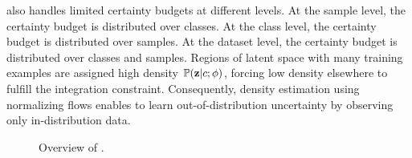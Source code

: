 \PostNet also handles limited certainty budgets at different levels. At the sample level, the certainty budget \smash{$\alpha_0\dataix = \sum_\iclass \alpha_\iclass\dataix$} is distributed over classes. At the class level, the certainty budget  is distributed over samples. At the dataset level, the certainty budget  is distributed over classes and samples. Regions of latent space with many training examples are assigned high density $\mathbb{P}(\bold{z} | c; \phi)$, forcing low density elsewhere to fulfill the integration constraint. Consequently, density estimation using normalizing flows enables \PostNetacro to learn out-of-distribution uncertainty by observing only in-distribution data.

\begin{figure}
    \vspace{-.3cm}
	\caption{Overview of \PostNet.}
	\label{fig:overview}
	\vspace{-2cm}
\end{figure}

